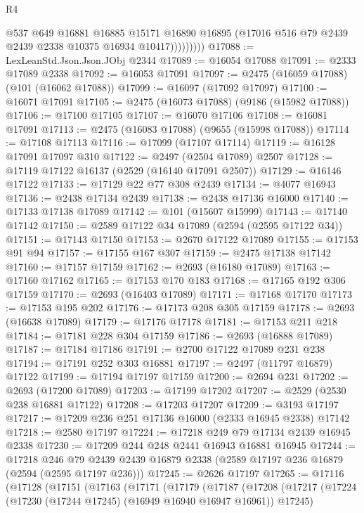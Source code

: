 \begin{lexlean}{R4}
\begin{coremodule}
                    @537
                    @649
                    @16881
                    @16885
                    @15171
                    @16890
                    @16895
                    (@17016 @516 @79 @2439 @2439 @2338 @10375 @16934 @10417)))))))))
@17088 := LexLeanStd.Json.Json.JObj @2344
@17089 := @16054 @17088
@17091 := @2333 @17089 @2338
@17092 := @16053 @17091
@17097 := @2475 (@16059 @17088) (@101 (@16062 @17088))
@17099 := @16097 (@17092 @17097)
@17100 := @16071 @17091
@17105 := @2475 (@16073 @17088) (@9186 (@15982 @17088))
@17106 := @17100 @17105
@17107 := @16070 @17106
@17108 := @16081 @17091
@17113 := @2475 (@16083 @17088) (@9655 (@15998 @17088))
@17114 := @17108 @17113
@17116 := @17099 (@17107 @17114)
@17119 := @16128 @17091 @17097 @310
@17122 := @2497 (@2504 @17089) @2507
@17128 := @17119 @17122 @16137 (@2529 (@16140 @17091 @2507))
@17129 := @16146 @17122
@17133 := @17129 @22 @77 @308 @2439
@17134 := @4077 @16943
@17136 := @2438 @17134 @2439
@17138 := @2438 @17136 @16000
@17140 := @17133 @17138 @17089
@17142 := @101 (@15607 @15999)
@17143 := @17140 @17142
@17150 := @2589 @17122 @34 @17089 (@2594 (@2595 @17122 @34))
@17151 := @17143 @17150
@17153 := @2670 @17122 @17089
@17155 := @17153 @91 @94
@17157 := @17155 @167 @307
@17159 := @2475 @17138 @17142
@17160 := @17157 @17159
@17162 := @2693 (@16180 @17089)
@17163 := @17160 @17162
@17165 := @17153 @170 @183
@17168 := @17165 @192 @306 @17159
@17170 := @2693 (@16403 @17089)
@17171 := @17168 @17170
@17173 := @17153 @195 @202
@17176 := @17173 @208 @305 @17159
@17178 := @2693 (@16638 @17089)
@17179 := @17176 @17178
@17181 := @17153 @211 @218
@17184 := @17181 @228 @304 @17159
@17186 := @2693 (@16888 @17089)
@17187 := @17184 @17186
@17191 := @2700 @17122 @17089 @231 @238
@17194 := @17191 @252 @303 @16881
@17197 := @2497 (@11797 @16879) @17122
@17199 := @17194 @17197 @17159
@17200 := @2694 @231
@17202 := @2693 (@17200 @17089)
@17203 := @17199 @17202
@17207 := @2529 (@2530 @238 @16881 @17122)
@17208 := @17203 @17207
@17209 := @3193 @17197
@17217 := @17209 @236 @251 @17136 @16000 (@2333 @16945 @2338) @17142
@17218 := @2580 @17197
@17224 := @17218 @249 @79 @17134 @2439 @16945 @2338
@17230 := @17209 @244 @248 @2441 @16943 @16881 @16945
@17244 := @17218
    @246
    @79
    @2439
    @2439
    @16879
    @2338
    (@2589 @17197 @236 @16879 (@2594 (@2595 @17197 @236)))
@17245 := @2626 @17197
@17265 := @17116
    (@17128
      (@17151
        (@17163
          (@17171
            (@17179
              (@17187
                (@17208
                  (@17217
                    (@17224 (@17230 (@17244 @17245) (@16949 @16940 @16947 @16961)) @17245)

\end{coremodule}
\end{lexlean}
